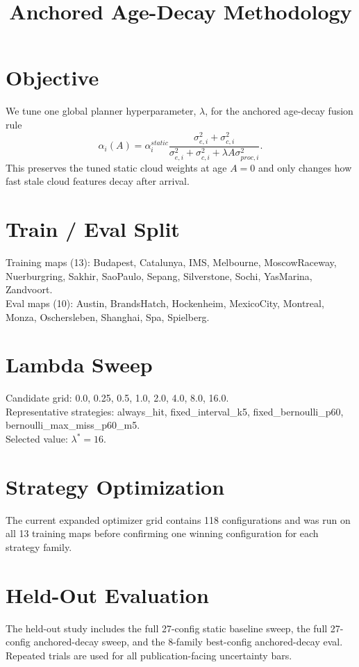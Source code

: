 \documentclass[conference]{IEEEtran}
\begin{document}
\title{Anchored Age-Decay Methodology}
\maketitle
\section{Objective}
We tune one global planner hyperparameter, $\lambda$, for the anchored age-decay fusion rule
\[
\alpha_i(A)=\alpha^{static}_i \frac{\sigma^2_{e,i}+\sigma^2_{c,i}}{\sigma^2_{e,i}+\sigma^2_{c,i}+\lambda A \sigma^2_{proc,i}}.
\]
This preserves the tuned static cloud weights at age $A=0$ and only changes how fast stale cloud features decay after arrival.

\section{Train / Eval Split}
Training maps (13): Budapest, Catalunya, IMS, Melbourne, MoscowRaceway, Nuerburgring, Sakhir, SaoPaulo, Sepang, Silverstone, Sochi, YasMarina, Zandvoort.\\
Eval maps (10): Austin, BrandsHatch, Hockenheim, MexicoCity, Montreal, Monza, Oschersleben, Shanghai, Spa, Spielberg.

\section{Lambda Sweep}
Candidate grid: 0.0, 0.25, 0.5, 1.0, 2.0, 4.0, 8.0, 16.0.\\
Representative strategies: always\_hit, fixed\_interval\_k5, fixed\_bernoulli\_p60, bernoulli\_max\_miss\_p60\_m5.\\
Selected value: $\lambda^* = 16$.

\section{Strategy Optimization}
The current expanded optimizer grid contains 118 configurations and was run on all 13 training maps before confirming one winning configuration for each strategy family.

\section{Held-Out Evaluation}
The held-out study includes the full 27-config static baseline sweep, the full 27-config anchored-decay sweep, and the 8-family best-config anchored-decay eval. Repeated trials are used for all publication-facing uncertainty bars.
\end{document}
